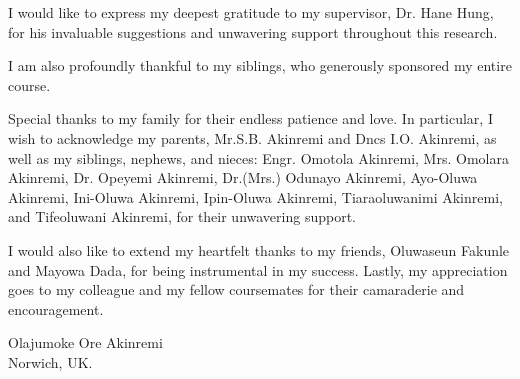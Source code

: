 
\def\baselinestretch{1.0}


I would like to express my deepest gratitude to my supervisor, Dr. Hane Hung, for his invaluable suggestions and unwavering support throughout this research.

\noindent
I am also profoundly thankful to my siblings, who generously sponsored my entire course.

\medskip

\noindent
Special thanks to my family for their endless patience and love. In particular, I wish to acknowledge my parents, Mr.S.B. Akinremi and Dncs I.O. Akinremi, as well as my siblings, nephews, and nieces: Engr. Omotola Akinremi, Mrs. Omolara Akinremi,
 Dr. Opeyemi Akinremi, Dr.(Mrs.) Odunayo Akinremi, Ayo-Oluwa Akinremi, Ini-Oluwa Akinremi, Ipin-Oluwa Akinremi, Tiaraoluwanimi Akinremi, and Tifeoluwani Akinremi, for their unwavering support.

I would also like to extend my heartfelt thanks to my friends, Oluwaseun Fakunle and Mayowa Dada, for being instrumental in my success. Lastly, my appreciation goes to my colleague and my fellow coursemates for their camaraderie and encouragement.

\bigskip\medskip

\noindent
\vskip0.4in  
\hfill Olajumoke Ore Akinremi \\
\vskip0.2in 
\hfill Norwich, UK.\\

